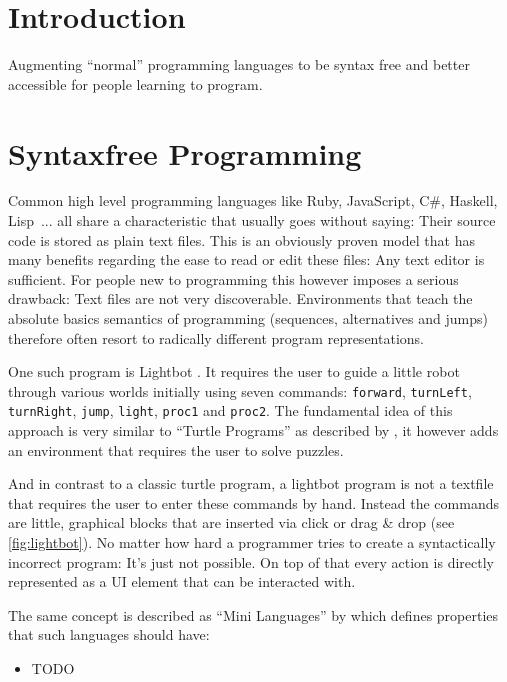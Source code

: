 \section{Introduction}
\label{sec:introduction}

Augmenting \enquote{normal} programming languages to be syntax free and better accessible for people learning to program.

\section{Syntaxfree Programming}
\label{sec:syntaxfree-programming}

Common high level programming languages like Ruby, JavaScript, C\#, Haskell, Lisp~... all share a characteristic that usually goes without saying: Their source code is stored as plain text files. This is an obviously proven model that has many benefits regarding the ease to read or edit these files: Any text editor is sufficient. For people new to programming this however imposes a serious drawback: Text files are not very discoverable. Environments that teach the absolute basics semantics of programming (sequences, alternatives and jumps) therefore often resort to radically different program representations.

One such program is Lightbot \cite{yaroslavski_lightbot}. It requires the user to guide a little robot through various worlds initially using seven commands: \texttt{forward}, \texttt{turnLeft}, \texttt{turnRight}, \texttt{jump}, \texttt{light}, \texttt{proc1} and \texttt{proc2}. The fundamental idea of this approach is very similar to \enquote{Turtle Programs} as described by \cite{papert_mindstorms_1982}, it however adds an environment that requires the user to solve puzzles.

And in contrast to a classic turtle program, a lightbot program is not a textfile that requires the user to enter these commands by hand. Instead the commands are little, graphical blocks that are inserted via click or drag \& drop (see \autoref{fig:lightbot}). No matter how hard a programmer tries to create a syntactically incorrect program: It's just not possible. On top of that every action is directly represented as a UI element that can be interacted with.

The same concept is described as \enquote{Mini Languages} by \cite{brusilovsky_mini-languages_1997} which defines properties that such languages should have:

\begin{itemize}
\item TODO
\end{itemize}

